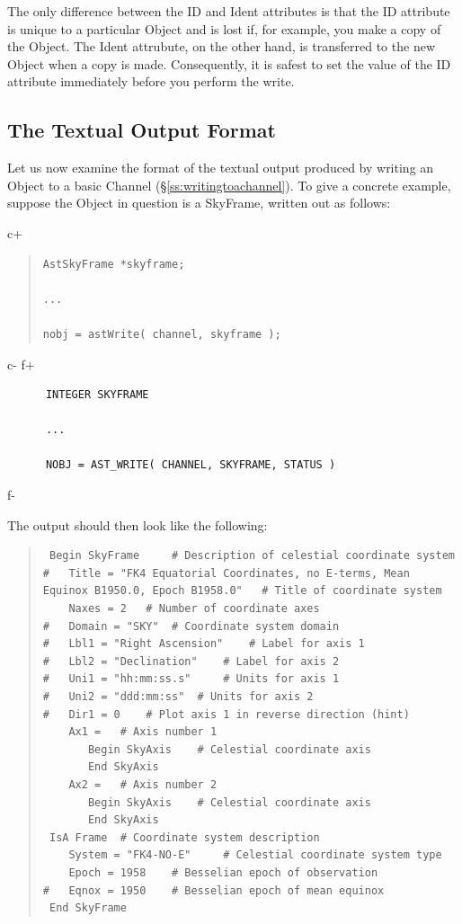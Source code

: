 \documentclass[twoside,11pt]{article}
\newcommand{\secref}[1]{\S\ref{#1}}
\newcommand{\secref}[1]{\ref{#1}}
\begin{document}
The only difference between the ID and Ident attributes is that the ID
attribute is unique to a particular Object and is lost if, for example,
you make a copy of the Object. The Ident attrubute, on the other hand, is
transferred to the new Object when a copy is made. Consequently, it is
safest to set the value of the ID attribute immediately before you
perform the write.

\subsection{\label{ss:textualoutputformat}The Textual Output Format} 

Let us now examine the format of the textual output produced by
writing an Object to a basic Channel
(\secref{ss:writingtoachannel}). To give a concrete example, suppose
the Object in question is a SkyFrame, written out as follows:

c+
\begin{quote}
\small
\begin{verbatim}
AstSkyFrame *skyframe;

...

nobj = astWrite( channel, skyframe );
\end{verbatim}
\normalsize
\end{quote}
c-
f+
\small
\begin{verbatim}
      INTEGER SKYFRAME

      ...

      NOBJ = AST_WRITE( CHANNEL, SKYFRAME, STATUS )
\end{verbatim}
\normalsize
f-

The output should then look like the following:

\begin{quote}
\small
\begin{verbatim}
 Begin SkyFrame 	# Description of celestial coordinate system
#   Title = "FK4 Equatorial Coordinates, no E-terms, Mean Equinox B1950.0, Epoch B1958.0" 	# Title of coordinate system
    Naxes = 2 	# Number of coordinate axes
#   Domain = "SKY" 	# Coordinate system domain
#   Lbl1 = "Right Ascension" 	# Label for axis 1
#   Lbl2 = "Declination" 	# Label for axis 2
#   Uni1 = "hh:mm:ss.s" 	# Units for axis 1
#   Uni2 = "ddd:mm:ss" 	# Units for axis 2
#   Dir1 = 0 	# Plot axis 1 in reverse direction (hint)
    Ax1 = 	# Axis number 1
       Begin SkyAxis 	# Celestial coordinate axis
       End SkyAxis
    Ax2 = 	# Axis number 2
       Begin SkyAxis 	# Celestial coordinate axis
       End SkyAxis
 IsA Frame 	# Coordinate system description
    System = "FK4-NO-E" 	# Celestial coordinate system type
    Epoch = 1958 	# Besselian epoch of observation
#   Eqnox = 1950 	# Besselian epoch of mean equinox
 End SkyFrame
\end{verbatim}
\normalsize
\end{quote}
\end{document}
